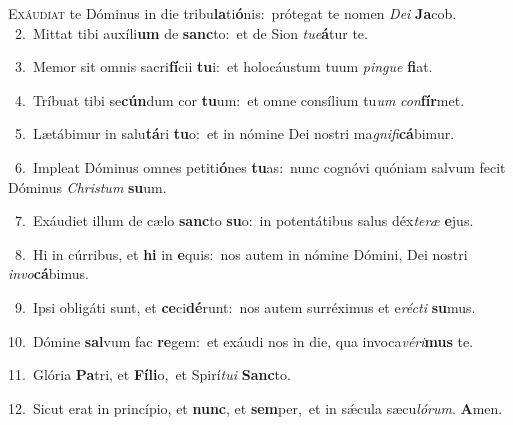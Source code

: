 \lettrine{\initial\textcolor{\initialcolor}{E}}{xáudiat} te Dóminus in die tribu\-\textbf{la}\-ti\-\textbf{ó}\-nis:~\star prótegat te nomen \textit{De}\-\textit{i} \textbf{Ja}\-cob.\\
{\numbfont\textcolor{\numbcolor}{~2.}}~Mittat tibi auxíli\textbf{um} de \textbf{sanc}\-to:~\star et de Sion \textit{tu}\-\textit{e}\textbf{á}tur te.\par
{\numbfont\textcolor{\numbcolor}{~3.}}~Memor sit omnis sacri\-\textbf{fí}\-cii \textbf{tu}\-i:~\star et holocáustum tuum \textit{pin}\-\textit{gue} \textbf{fi}\-at.\par
{\numbfont\textcolor{\numbcolor}{~4.}}~Tríbuat tibi se\-\textbf{cún}\-dum cor \textbf{tu}\-um:~\star et omne consílium tu\textit{um} \textit{con}\-\textbf{fír}met.\par
{\numbfont\textcolor{\numbcolor}{~5.}}~Lætábimur in salu\-\textbf{tá}\-ri \textbf{tu}\-o:~\star et in nómine Dei nostri ma\-\textit{gni}\-\textit{fi}\textbf{cá}bimur.\par
{\numbfont\textcolor{\numbcolor}{~6.}}~Impleat Dóminus omnes petiti\-\textbf{ó}\-nes \textbf{tu}\-as:~\star nunc cognóvi quóniam salvum fecit Dóminus \textit{Chris}\-\textit{tum} \textbf{su}\-um.\par
{\numbfont\textcolor{\numbcolor}{~7.}}~Exáudiet illum de cælo \textbf{sanc}\-to \textbf{su}\-o:~\star in potentátibus salus déx\-\textit{te}\-\textit{ræ} \textbf{e}\-jus.\par
{\numbfont\textcolor{\numbcolor}{~8.}}~Hi in cúrribus, et \textbf{hi} in \textbf{e}\-quis:~\star nos autem in nómine Dómini, Dei nostri \textit{in}\-\textit{vo}\textbf{cá}bimus.\par
{\numbfont\textcolor{\numbcolor}{~9.}}~Ipsi obligáti sunt, et \textbf{ce}\-ci\-\textbf{dé}\-runt:~\star nos autem surréximus et e\-\textit{réc}\-\textit{ti} \textbf{su}\-mus.\par
{\numbfont\textcolor{\numbcolor}{10.}}~Dómine \textbf{sal}\-vum fac \textbf{re}\-gem:~\star et exáudi nos in die, qua invoca\-\textit{vé}\-\textit{ri}\textbf{mus} te.\par
{\numbfont\textcolor{\numbcolor}{11.}}~Glória \textbf{Pa}\-tri, et \textbf{Fí}\-\textbf{li}o,~\star et Spirí\-\textit{tu}\-\textit{i} \textbf{Sanc}\-to.\par
{\numbfont\textcolor{\numbcolor}{12.}}~Sicut erat in princípio, et \textbf{nunc}\-, et \textbf{sem}\-per,~\star et in sǽcula sæcu\-\textit{ló}\-\textit{rum}. \textbf{A}\-men.\par
